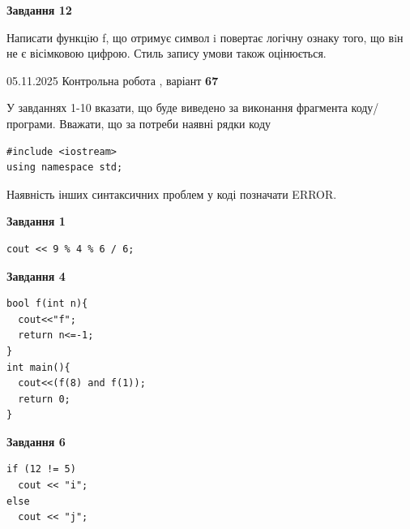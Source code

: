 \documentclass[12pt, ukrainian]{article}
\begin{document}
{\begin {large}
\begin{minipage}[t]{11.0cm}
\begin{center}
\textbf{Завдання 12}
\end{center}

Написати функцiю f, що отримує символ i повертає логічну ознаку того, що вiн не є вісімковою цифрою. Стиль запису умови також оцінюється.\par

\end{minipage}

\end {large}}
\newpage

{\Large{05.11.2025 Контрольна робота , варіант  \No \textbf { 67 }\par}}
{
\begin {large}
У завданнях 1-10 вказати, що буде виведено за виконання фрагмента коду/про\-гра\-ми.
Вважати, що за потреби наявні рядки коду
\begin{verbatim}
#include <iostream>
using namespace std;
\end{verbatim}
Наявність інших синтаксичних проблем у коді позначати ERROR.

\begin{minipage}[t]{7.0cm}

\begin{center}
\textbf{Завдання 1}
\end{center}
\vspace{-8mm}

\begin{verbatim}
cout << 9 % 4 % 6 / 6;
\end{verbatim}



\begin{center}
\textbf{Завдання 4}
\end{center}
\vspace{-8mm}

\begin{verbatim}
bool f(int n){
  cout<<"f";
  return n<=-1;
}
int main(){
  cout<<(f(8) and f(1));
  return 0;
}
\end{verbatim}



\begin{center}
\textbf{Завдання 6}
\end{center}
\vspace{-8mm}

\begin{verbatim}
if (12 != 5)
  cout << "i";
else
  cout << "j";
\end{verbatim}




\end{minipage}
\end{large}}
\end{document}
